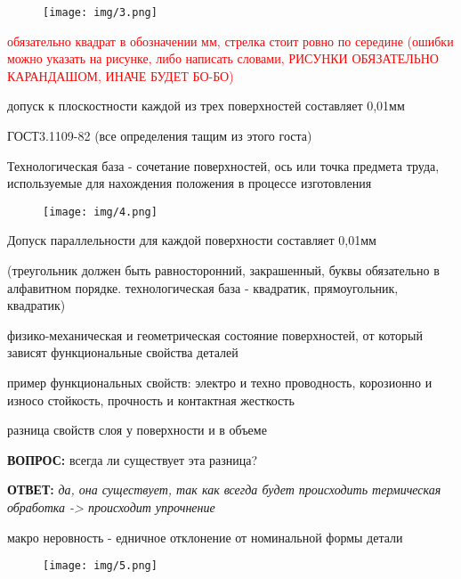 {\begin{center}
    \begin{figure}[H]
    \centering\texttt{[image: img/3.png]} 
    \end{figure}
    
    \par \textcolor{red}{обязательно квадрат в обозначении мм, стрелка стоит ровно по середине (ошибки можно указать на рисунке, либо написать словами, РИСУНКИ ОБЯЗАТЕЛЬНО КАРАНДАШОМ, ИНАЧЕ БУДЕТ БО-БО)}
    \par допуск к плоскостности каждой из трех поверхностей составляет 0,01мм
    \par ГОСТ3.1109-82 (все определения тащим из этого госта)
    \par Технологическая база - сочетание поверхностей, ось или точка предмета труда, используемые для нахождения положения в процессе изготовления

    \begin{figure}[H]
    \centering\texttt{[image: img/4.png]} 
    \end{figure}

    \par Допуск параллельности для каждой поверхности составляет 0,01мм
    \par (треугольник должен быть равносторонний, закрашенный, буквы обязательно в алфавитном порядке. технологическая база - квадратик, прямоугольник, квадратик)

    \par физико-механическая и геометрическая состояние поверхностей, от который зависят функциональные свойства деталей

    \par пример функциональных свойств: электро и техно проводность, корозионно и износо стойкость, прочность и контактная жесткость

    \par разница свойств слоя у поверхности и в объеме 

    \par \textbf{ВОПРОС:} всегда ли существует эта разница?

    \par \textbf{ОТВЕТ:} \textit{да, она существует, так как всегда будет происходить термическая обработка -> происходит упрочнение}

    \par макро неровность - едничное отклонение от номинальной формы детали

    \begin{figure}[H]
    \centering\texttt{[image: img/5.png]} 
    \end{figure}


\end{center}}
